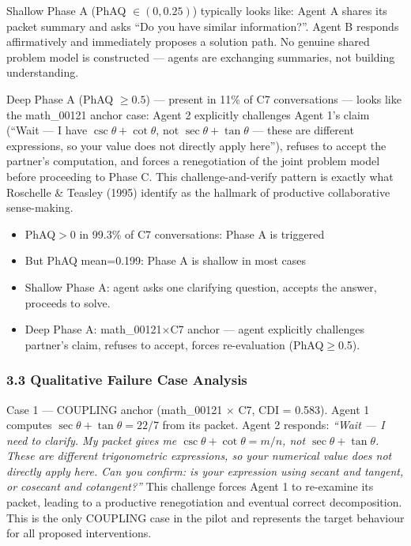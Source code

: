 \documentclass[
  11pt,
]{article}
\providecommand{\tightlist}{%
  \setlength{\itemsep}{0pt}\setlength{\parskip}{0pt}}
\begin{document}
Shallow Phase A (PhAQ $\in (0, 0.25)$) typically looks like: Agent A shares its packet summary and asks ``Do you have similar information?''. Agent B responds affirmatively and immediately proposes a solution path. No genuine shared problem model is constructed --- agents are exchanging summaries, not building understanding.

Deep Phase A (PhAQ $\geq 0.5$) --- present in 11\% of C7 conversations --- looks like the math\_00121 anchor case: Agent 2 explicitly challenges Agent 1's claim (``Wait --- I have $\csc\theta + \cot\theta$, not $\sec\theta + \tan\theta$ --- these are different expressions, so your value does not directly apply here''), refuses to accept the partner's computation, and forces a renegotiation of the joint problem model before proceeding to Phase C. This challenge-and-verify pattern is exactly what Roschelle \& Teasley (1995) identify as the hallmark of productive collaborative sense-making.

\begin{itemize}
\tightlist
\item
  PhAQ$>$0 in 99.3\% of C7 conversations: Phase A is triggered
\item
  But PhAQ mean=0.199: Phase A is shallow in most cases
\item
  Shallow Phase A: agent asks one clarifying question, accepts the answer, proceeds to solve.
\item
  Deep Phase A: math\_00121$\times$C7 anchor --- agent explicitly challenges partner's claim, refuses to accept, forces re-evaluation (PhAQ$\geq$0.5).
\end{itemize}

\subsubsection{3.3 Qualitative Failure Case
Analysis}\label{qualitative-failure-case-analysis}

Case 1 --- COUPLING anchor (math\_00121 $\times$ C7, CDI = 0.583).
Agent 1 computes $\sec\theta + \tan\theta = 22/7$ from its packet. Agent 2 responds: \textit{``Wait --- I need to clarify. My packet gives me $\csc\theta + \cot\theta = m/n$, not $\sec\theta + \tan\theta$. These are different trigonometric expressions, so your numerical value does not directly apply here. Can you confirm: is your expression using secant and tangent, or cosecant and cotangent?''} This challenge forces Agent 1 to re-examine its packet, leading to a productive renegotiation and eventual correct decomposition. This is the only COUPLING case in the pilot and represents the target behaviour for all proposed interventions.
\end{document}
